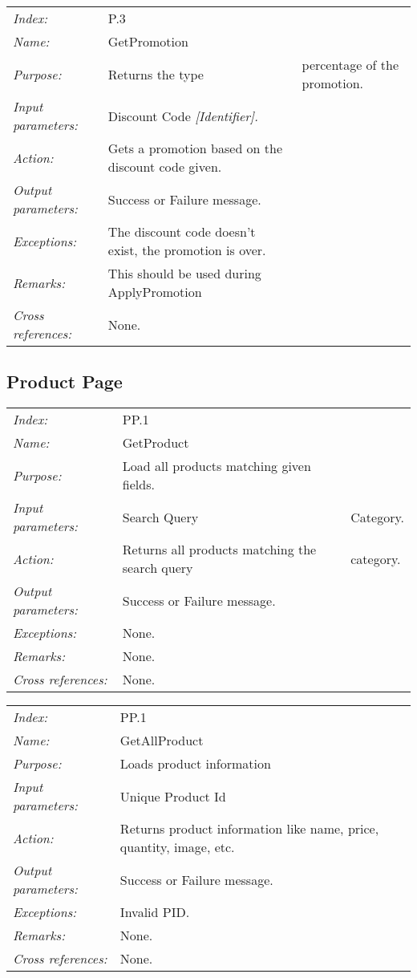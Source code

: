\documentclass[10pt,letter]{article}
\begin{document}
\begin{tabularx}{\textwidth}{l X}
    \it{Index:} & P.3 \\
    \it{Name:} & GetPromotion \\
    \it{Purpose:} & Returns the type & percentage of the promotion. \\
    \it{Input parameters:} & Discount Code \it{[Identifier]}.\\
    \it{Action:} & Gets a promotion based on the discount code given.\\
    \it{Output parameters:} & Success or Failure message. \\
    \it{Exceptions:} & The discount code doesn't exist, the promotion is over. \\
    \it{Remarks:} & This should be used during ApplyPromotion\\
    \it{Cross references:} & None. \\
    \hline
\end{tabularx}

\subsection{Product Page}

\begin{tabularx}{\textwidth}{l X}
    \it{Index:} & PP.1 \\
    \it{Name:} & GetProduct \\
    \it{Purpose:} & Load all products matching given fields.\\
    \it{Input parameters:} & Search Query & Category.\\
    \it{Action:} & Returns all products matching the search query & category.\\
    \it{Output parameters:} & Success or Failure message. \\
    \it{Exceptions:} & None. \\
    \it{Remarks:} & None. \\
    \it{Cross references:} & None. \\
    \hline
\end{tabularx}

\begin{tabularx}{\textwidth}{l X}
    \it{Index:} & PP.1 \\
    \it{Name:} & GetAllProduct \\
    \it{Purpose:} & Loads product information \\
    \it{Input parameters:} & Unique Product Id \\
    \it{Action:} & Returns product information like name, price, quantity, image, etc.\\
    \it{Output parameters:} & Success or Failure message. \\
    \it{Exceptions:} & Invalid PID. \\
    \it{Remarks:} & None. \\
    \it{Cross references:} & None. \\
    \hline
\end{tabularx}
\end{document}
